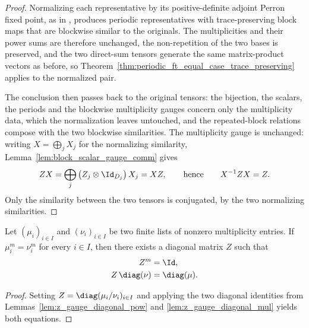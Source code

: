 \begin{proof}\leanok
    Normalizing each representative by its positive-definite adjoint Perron
    fixed point, as in \cite[lines~313--332]{DeLasCuevas2017Irreducible},
    produces periodic representatives with trace-preserving block maps that are
    blockwise similar to the originals. The multiplicities and their power
    sums are therefore unchanged, the non-repetition of the two bases is
    preserved, and the two direct-sum tensors generate the same matrix-product
    vectors as before, so
    Theorem~\ref{thm:periodic_ft_equal_case_trace_preserving} applies to the
    normalized pair.

    The conclusion then passes back to the original tensors: the bijection,
    the scalars, the periods and the blockwise multiplicity gauges concern
    only the multiplicity data, which the normalization leaves untouched, and
    the repeated-block relations compose with the two blockwise similarities.
    The multiplicity gauge is unchanged: writing $X=\bigoplus_jX_j$ for the
    normalizing similarity, Lemma~\ref{lem:block_scalar_gauge_comm} gives
    \begin{align}
        ZX=\bigoplus_{j}\left(Z_j\otimes\Id_{D_j}\right)X_j=XZ,
        \qquad\text{hence}\qquad
        X^{-1}ZX=Z.
        \notag
    \end{align}
    Only the similarity between the two tensors is conjugated, by the two
    normalizing similarities.
\end{proof}

\begin{lemma}
    \label{thm:zgauge_construction}
    \leanok
    Let $(\mu_i)_{i\in I}$ and $(\nu_i)_{i\in I}$ be two finite lists of
    nonzero multiplicity entries. If $\mu_i^m=\nu_i^m$ for every $i\in I$,
    then there exists a diagonal matrix $Z$ such that
    \begin{align}
        Z^m           & =\Id, \notag        \\
        Z\,\diag(\nu) & =\diag(\mu). \notag
    \end{align}
\end{lemma}

\begin{proof}\leanok
    Setting $Z=\diag(\mu_i/\nu_i)_{i\in I}$ and applying the two diagonal
    identities from Lemmas~\ref{lem:z_gauge_diagonal_pow} and
    \ref{lem:z_gauge_diagonal_mul} yields both equations.
\end{proof}

